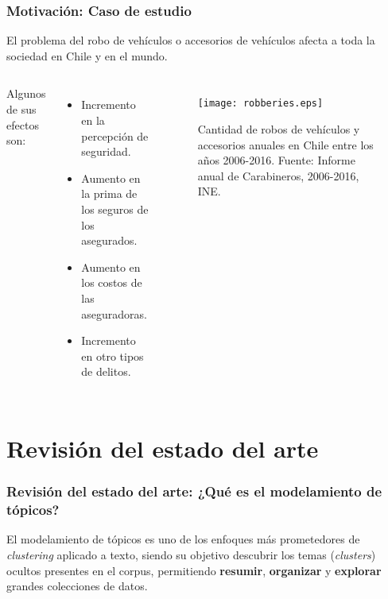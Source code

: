 \documentclass[
	spanish, %
	aspectratio=43, %
	hyperref={pdfencoding=auto,psdextra},
	xcolor={dvipsnames,table,usenames},
]{beamer}
\begin{document}
\begin{frame}[t]
\frametitle{Motivación: Caso de estudio} 

El problema del robo de vehículos o accesorios de vehículos afecta a toda la sociedad en Chile y en el mundo. 
\begin{columns}

Algunos de sus efectos son:
  \begin{itemize}
    \item Incremento en la percepción de seguridad.
    \item Aumento en la prima de los seguros de los asegurados.
    \item Aumento en los costos de las aseguradoras.
    \item Incremento en otro tipos de delitos.
  \end{itemize}
 
\begin{figure}
    \texttt{[image: robberies.eps]} 
    \caption{Cantidad de robos de vehículos y accesorios anuales en Chile entre los años 2006-2016. Fuente: Informe anual de Carabineros, 2006-2016, INE.} 
    \label{fig:antecedente}
\end{figure}

\end{columns}
\end{frame}


\section{Revisión del estado del arte}

\begin{frame}[t]
\frametitle{Revisión del estado del arte: ¿Qué es el modelamiento de tópicos?}
El modelamiento de tópicos es uno de los enfoques más prometedores de \textit{clustering} aplicado a texto, siendo su objetivo descubrir los temas (\textit{clusters}) ocultos presentes en el corpus, permitiendo \textbf{resumir}, \textbf{organizar} y \textbf{explorar} grandes colecciones de datos.

\begin{figure}
\end{figure}

\end{frame}
\end{document}
